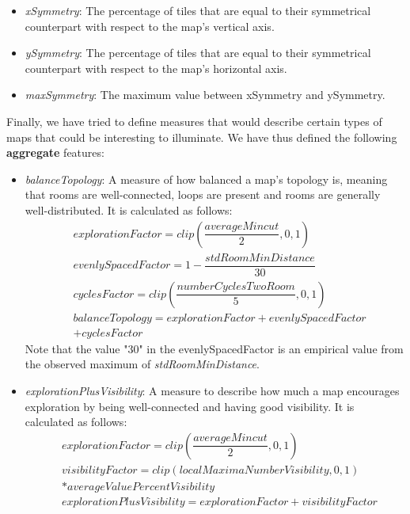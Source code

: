 \documentclass{Configuration_Files/PoliMi3i_thesis}
\begin{document}
\begin{itemize}
    \item \textit{xSymmetry}: The percentage of tiles that are equal to their symmetrical counterpart with respect to the map's vertical axis.
    \item \textit{ySymmetry}: The percentage of tiles that are equal to their symmetrical counterpart with respect to the map's horizontal axis.
    \item \textit{maxSymmetry}: The maximum value between xSymmetry and ySymmetry.
\end{itemize}

Finally, we have tried to define measures that would describe certain types of maps that could be interesting to illuminate. We have thus defined the following \textbf{aggregate} features:

\begin{itemize}
    \item \textit{balanceTopology}: A measure of how balanced a map's topology is, meaning that rooms are well-connected, loops are present and rooms are generally well-distributed. It is calculated as follows:
    \begin{equation}
    \begin{split}
        &explorationFactor = clip\left(\dfrac{averageMincut}{2}, 0, 1\right) \\
        &evenlySpacedFactor = 1 - \dfrac{stdRoomMinDistance}{30} \\
        &cyclesFactor = clip\left(\dfrac{numberCyclesTwoRoom}{5}, 0, 1\right) \\
        &balanceTopology = explorationFactor + evenlySpacedFactor \\
        &+ cyclesFactor
    \end{split}
    \end{equation}
    Note that the value "30" in the evenlySpacedFactor is an empirical value from the observed maximum of \textit{stdRoomMinDistance}.
    \item \textit{explorationPlusVisibility}: A measure to describe how much a map encourages exploration by being well-connected and having good visibility. It is calculated as follows:
    \begin{equation}
    \begin{split}
        &explorationFactor = clip\left(\dfrac{averageMincut}{2}, 0, 1\right) \\
        &visibilityFactor = clip\left(localMaximaNumberVisibility, 0, 1\right)\\ 
        &* averageValuePercentVisibility \\
        &explorationPlusVisibility = explorationFactor + visibilityFactor
    \end{split}
    \end{equation}
\end{itemize}
\end{document}
